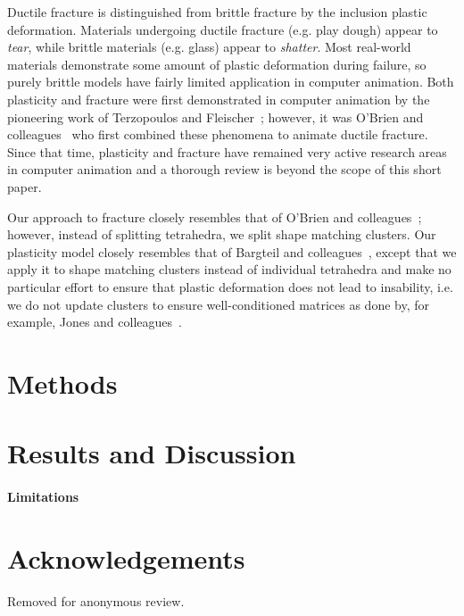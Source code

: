 \documentclass[review]{acmsiggraph}
\begin{document}
Ductile fracture is distinguished from brittle fracture by the inclusion plastic deformation.  Materials undergoing ductile
fracture (e.g. play dough) appear to {\em tear}, while brittle materials (e.g. glass) appear to {\em shatter}.  Most
real-world materials demonstrate some amount of plastic deformation during failure, so purely brittle models have fairly limited
application in computer animation.  
Both plasticity and fracture
were first demonstrated in computer animation by the pioneering work of Terzopoulos and Fleischer~; 
however, it was O'Brien and colleagues~
who first combined these phenomena to animate ductile fracture.  Since that time, plasticity and fracture have
remained very active research areas in computer animation and a thorough review is beyond the scope of this short paper.

Our approach 
to fracture closely resembles that of O'Brien and colleagues~; however, instead of splitting tetrahedra,
we split shape matching clusters.  Our plasticity model closely resembles that of Bargteil and colleagues~, except that
we apply it to shape matching clusters instead of individual tetrahedra and make no particular effort to ensure that plastic deformation does not
lead to insability, i.e. we do not update clusters to ensure well-conditioned matrices as done by, for example, Jones and colleagues~.

\section{Methods}

\section{Results and Discussion}

\paragraph{Limitations}

\section*{Acknowledgements}
Removed for anonymous review.



\end{document}
